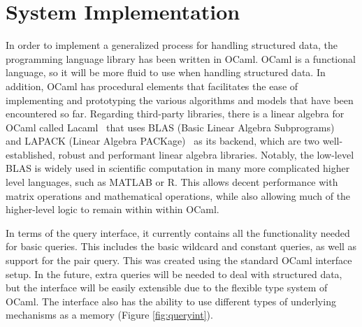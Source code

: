 \documentclass{sig-alternate}
\begin{document}

\section{System Implementation}
\label{sec:sysimp}

In order to implement a generalized process for handling structured data, the programming language 
library has been written in OCaml. OCaml is a functional language, so it will be more fluid to use 
when handling structured data. In addition, OCaml has procedural elements that facilitates the ease 
of implementing and prototyping the various algorithms and models that have been encountered so far. 
Regarding third-party libraries, there is a linear algebra for OCaml called Lacaml~\cite{lacaml} that uses BLAS 
(Basic Linear Algebra Subprograms)~\cite{blas}
and LAPACK (Linear Algebra PACKage)~\cite{lapack}
as its backend, which are two well-established, robust and performant linear algebra 
libraries. Notably, the low-level BLAS is widely used in scientific computation in many more complicated
higher level languages, such as MATLAB or R. This allows decent performance with matrix operations
and mathematical operations, while also allowing
much of the higher-level logic to remain within within OCaml.

In terms of the query interface, it currently contains all the functionality needed for basic
queries.  This includes the basic wildcard and constant queries, as well as support for the
pair query. This was created using the standard OCaml interface setup. In the
future, extra queries will be needed to deal with structured data, but the interface will be easily
extensible due to the flexible type system of OCaml. The interface also has the ability to use
different types of underlying mechanisms as a memory (Figure \ref{fig:queryint}).
\end{document}
